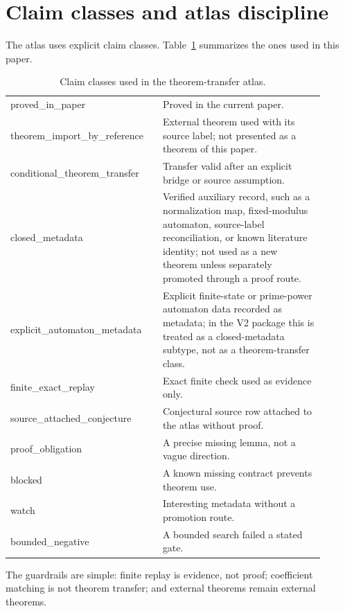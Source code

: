 \documentclass[11pt,a4paper]{article}
\begin{document}
\section{Claim classes and atlas discipline}
\label{sec:claim-classes}

The atlas uses explicit claim classes.  Table~\ref{tab:claim-classes}
summarizes the ones used in this paper.

\begin{table}[htbp]
\centering
\small
\begin{tabular}{>{\ttfamily}p{0.42\linewidth}p{0.48\linewidth}}
\hline
proved\_in\_paper & Proved in the current paper.\\
theorem\_import\_by\_reference & External theorem used with its source label; not presented as a theorem of this paper.\\
conditional\_theorem\_transfer & Transfer valid after an explicit bridge or source assumption.\\
closed\_metadata & Verified auxiliary record, such as a normalization map, fixed-modulus automaton, source-label reconciliation, or known literature identity; not used as a new theorem unless separately promoted through a proof route.\\
explicit\_automaton\_metadata & Explicit finite-state or prime-power automaton data recorded as metadata; in the V2 package this is treated as a closed-metadata subtype, not as a theorem-transfer class.\\
finite\_exact\_replay & Exact finite check used as evidence only.\\
source\_attached\_conjecture & Conjectural source row attached to the atlas without proof.\\
proof\_obligation & A precise missing lemma, not a vague direction.\\
blocked & A known missing contract prevents theorem use.\\
watch & Interesting metadata without a promotion route.\\
bounded\_negative & A bounded search failed a stated gate.\\
\hline
\end{tabular}
\caption{Claim classes used in the theorem-transfer atlas.}
\label{tab:claim-classes}
\end{table}

The guardrails are simple: finite replay is evidence, not proof; coefficient
matching is not theorem transfer; and external theorems remain external
theorems.
\end{document}
